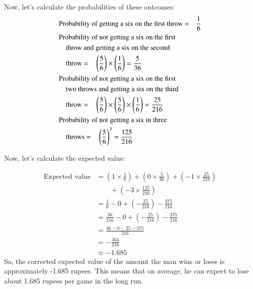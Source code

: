 \documentclass[journal,12pt,twocolumn]{IEEEtran}
\theoremstyle{remark}
\begin{document}
Now, let's calculate the probabilities of these outcomes:
\begin{align*}
    & \text{Probability of getting a six on the first throw =}\quad\frac{1}{6} \\
    & \text{Probability of not getting a six on the first}\\
    & \text{\quad throw and getting a six on the second} \\
    & \text{\quad throw =}\quad\left(\frac{5}{6}\right) \times \left(\frac{1}{6}\right)=\frac{5}{36} \\
    & \text{Probability of not getting a six on the first}\\ 
    & \text{\quad two throws and getting a six on the third}\\
    & \text{\quad throw =}\quad\left(\frac{5}{6}\right) \times \left(\frac{5}{6}\right) \times \left(\frac{1}{6}\right) = \frac{25}{216} \\
    & \text{Probability of not getting a six in three}\\
    & \text{\quad throws =}\quad\left(\frac{5}{6}\right)^3 = \frac{125}{216}
\end{align*}

Now, let's calculate the expected value:

\begin{align*}
    \text{Expected value} 
     & = \left( 1 \times \frac{1}{6}\right) + \left( 0 \times \frac{5}{36}\right) + \left(-1 \times \frac{25}{216}\right)\\
     & \quad \quad + \left(-3 \times \frac{125}{216}\right)\\
     & = \frac{1}{6} - 0 + \left(-\frac{25}{216}\right) - \frac{375}{216}\\
     & = \frac{36}{216} - 0 + \left(-\frac{25}{216}\right) - \frac{375}{216}\\
     & = \frac{36 - 0 - 25 - 375}{216}\\
     & = -\frac{364}{216}\\
     & \approx -1.685
\end{align*}
So, the corrected expected value of the amount the man wins or loses is approximately -1.685 rupees. This means that on average, he can expect to lose about 1.685 rupees per game in the long run.
\end{document}
